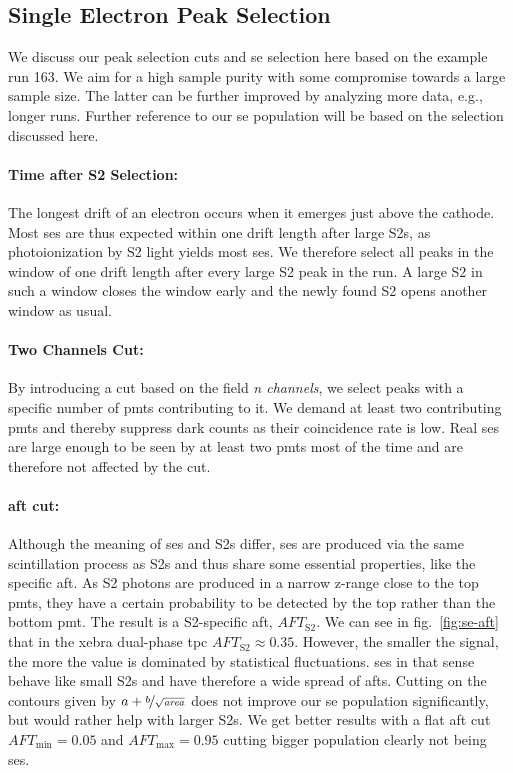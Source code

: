 
\FloatBarrier
\subsection{Single Electron Peak Selection}
\label{ssec:tagging}
\FloatBarrier


We discuss our peak selection cuts and \gls{se} selection here based on the example run 163.
We aim for a high sample purity with some compromise towards a large sample size.
The latter can be further improved by analyzing more data, e.g., longer runs.
Further reference to our \gls{se} population will be based on the selection discussed here.

\paragraph{Time after S2 Selection:} The longest drift of an electron occurs when it emerges just above the cathode.
Most \glspl{se} are thus expected within one drift length after large S2s, as photoionization by S2 light yields most \glspl{se}.
We therefore select all peaks in the window of one drift length after every large S2 peak in the run.
A large S2 in such a window closes the window early and the newly found S2 opens another window as usual.

\paragraph{Two Channels Cut:} By introducing a cut based on the field \emph{n channels}, we select peaks with a specific number of \glspl{pmt} contributing to it.
We demand at least two contributing \glspl{pmt} and thereby suppress dark counts as their coincidence rate is low.
Real \glspl{se} are large enough to be seen by at least two \glspl{pmt} most of the time and are therefore not affected by the cut.

\paragraph{\gls{aft} cut:} Although the meaning of \glspl{se} and S2s differ, \glspl{se} are produced via the same scintillation process as S2s and thus share some essential properties, like the specific \gls{aft}.
As S2 photons are produced in a narrow z-range close to the top \glspl{pmt}, they have a certain probability to be detected by the top rather than the bottom \gls{pmt}.
The result is a S2-specific \gls{aft}, $ \mathit{AFT}_\mathrm{S2} $.
We can see in fig.~\ref{fig:se-aft} that in the \gls{xebra} dual-phase \gls{tpc} $ \mathit{AFT}_\mathrm{S2} \approx 0.35 $.
However, the smaller the signal, the more the value is dominated by statistical fluctuations.
\glspl{se} in that sense behave like small S2s and have therefore a wide spread of \glspl{aft}.
Cutting on the contours given by $ a + \nicefrac{b}{\sqrt{\mathit{area}}} $ does not improve our \gls{se} population significantly, but would rather help with larger S2s.
We get better results with a flat \gls{aft} cut $ \mathit{AFT}_\mathrm{min} = 0.05 $ and $ \mathit{AFT}_\mathrm{max} = 0.95 $ cutting bigger population clearly not being \glspl{se}.

